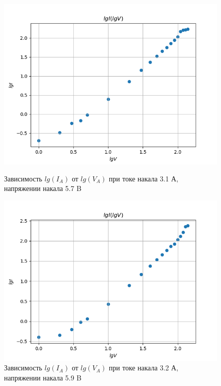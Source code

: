 \documentclass[a4paper]{article}
\begin{document}
\begin{figure}[h]
\begin{center}
\begin{minipage}[h]{0.45\linewidth}
\includegraphics[width=1\linewidth]{./Diode/graph_9.png}
\caption{Зависимость $lg(I_A)$ от $lg(V_A)$ при токе накала 3.1 А, напряжении накала 5.7 B }
\label{ris:experimcoded}
\end{minipage}
\hfill 
\begin{minipage}[h]{0.45\linewidth}
\includegraphics[width=1\linewidth]{./Diode/graph_10.png}
\caption{Зависимость $lg(I_A)$ от $lg(V_A)$ при токе накала 3.2 А, напряжении накала 5.9 B }
\label{ris:experimcoded}
\end{minipage}
\end{center}
\end{figure}
\end{document}
